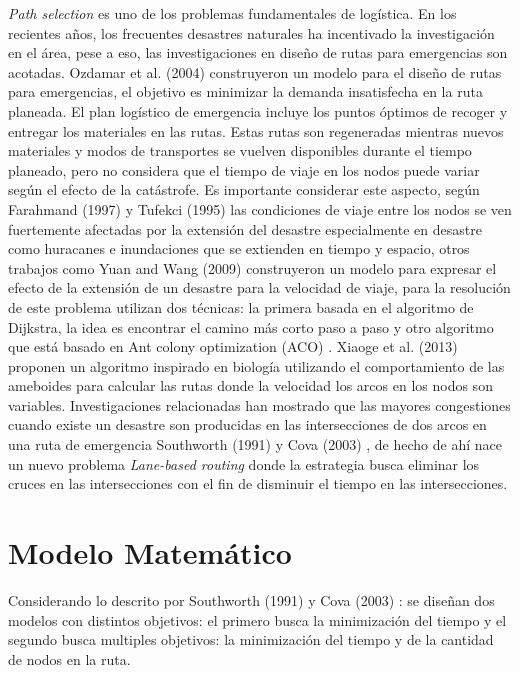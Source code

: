 \documentclass[letter, 10pt]{article}
\begin{document}
\textit{Path selection} es uno de los problemas fundamentales de logística. En los recientes años, los frecuentes desastres naturales ha incentivado la investigación en el área, pese a eso, las investigaciones en diseño de rutas para emergencias son acotadas.  Ozdamar et al. (2004) \cite{ozdamar2004emergency} construyeron un modelo para el diseño de rutas para emergencias, el objetivo es minimizar la demanda insatisfecha en la ruta planeada. El plan logístico de emergencia incluye los puntos óptimos de recoger y entregar los materiales en las rutas. Estas rutas son regeneradas mientras nuevos materiales y modos de transportes se vuelven disponibles durante el tiempo planeado, pero no considera que el tiempo de viaje en los nodos puede variar según el efecto de la catástrofe. Es  importante considerar este aspecto, según Farahmand (1997) \cite{farahmand1997application} y Tufekci  (1995) \cite{tufekci1995integrated} las condiciones de viaje entre los nodos se ven fuertemente afectadas por la extensión del desastre especialmente en desastre como huracanes e inundaciones que se extienden en tiempo y espacio, otros trabajos como Yuan and Wang (2009) \cite{Yuan20091081} construyeron un modelo para expresar el efecto de la extensión de un desastre para la velocidad de viaje, para la resolución de este problema utilizan dos técnicas: la primera basada en el algoritmo de Dijkstra, la idea es encontrar el camino más corto paso a paso y otro algoritmo que está basado en Ant colony optimization (ACO) \cite{Yuan20091081}. Xiaoge et al. (2013) \cite{zhang2013route} proponen un algoritmo inspirado en biología utilizando el comportamiento de las ameboides para calcular las rutas donde la velocidad los arcos en los nodos son variables. Investigaciones relacionadas han mostrado que las mayores congestiones cuando existe un desastre son producidas en las intersecciones de dos arcos en una ruta de emergencia Southworth (1991) \cite{southworth1991regional} y Cova (2003) \cite{cova2003network}, de hecho de ahí nace un nuevo problema \textit{Lane-based routing} donde la estrategia busca eliminar los cruces en las intersecciones con el fin de disminuir el tiempo en las intersecciones. \cite{cova2003network}


\section{Modelo Matem\'atico}
Considerando lo descrito por Southworth (1991) \cite{southworth1991regional} y Cova (2003) \cite{cova2003network}: se diseñan dos modelos con distintos objetivos: el primero busca la minimización del tiempo y el segundo busca multiples objetivos: la minimización del tiempo y de la cantidad de nodos en la ruta.
\end{document}
